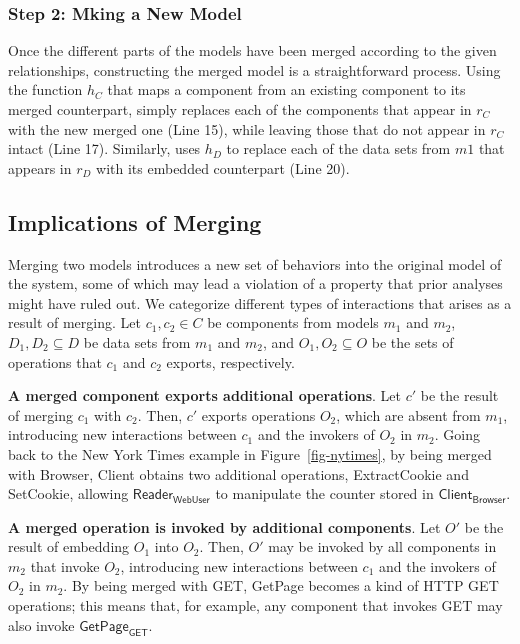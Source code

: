 \subsubsection{Step 2: Mking a New Model}

Once the different parts of the models have been merged according to
the given relationships, constructing the merged model is a
straightforward process. Using the function $h_{C}$ that maps a component
from an existing component to its merged counterpart, 
simply replaces each of the components that appear in $r_{C}$ with the
new merged one (Line 15), while leaving those that do not appear in
$r_{C}$ intact (Line 17). Similarly,  uses $h_{D}$
to replace each of the data sets from $m1$ that appears in $r_{D}$
with its embedded counterpart (Line 20).  

\subsection{Implications of Merging}

Merging two models introduces a new set of behaviors into
the original model of the system, some of which may lead a violation
of a property that prior analyses might have ruled out. We categorize
different types of interactions that arises as a result of
merging. Let $c_1, c_2 \in C$ be components from models $m_{1}$ and
$m_{2}$, $D_1, D_2 \subseteq D$ be data sets from $m_{1}$ and $m_{2}$, and
$O_1, O_2 \subseteq O$ be the sets of operations that $c_1$ and $c_2$
exports, respectively. 

\textbf{A merged component exports additional operations}. Let $c'$ be
the result of merging $c_1$ with $c_2$. Then, $c'$ exports operations
$O_2$, which are absent from $m_1$, introducing new interactions
between $c_1$ and the invokers of $O_2$ in $m_2$. Going back to the
New York Times example in Figure~\ref{fig-nytimes}, by being merged
with \textsf{Browser}, \textsf{Client} obtains two additional
operations, \textsf{ExtractCookie} and \textsf{SetCookie}, allowing
$\textsf{Reader}_\textsf{WebUser}$ to manipulate the counter stored in
$\textsf{Client}_\textsf{Browser}$.

\textbf{A merged operation is invoked by additional components}. Let $O'$
be the result of embedding $O_1$ into $O_2$. Then, $O'$ may be invoked
by all components in $m_2$ that invoke $O_2$, introducing new interactions
between $c_1$ and the invokers of $O_2$ in $m_2$. By being merged with
\textsf{GET}, \textsf{GetPage} becomes a kind of HTTP GET operations;
this means that, for example, any component that invokes \textsf{GET}
may also invoke $\textsf{GetPage}_\textsf{GET}$.

